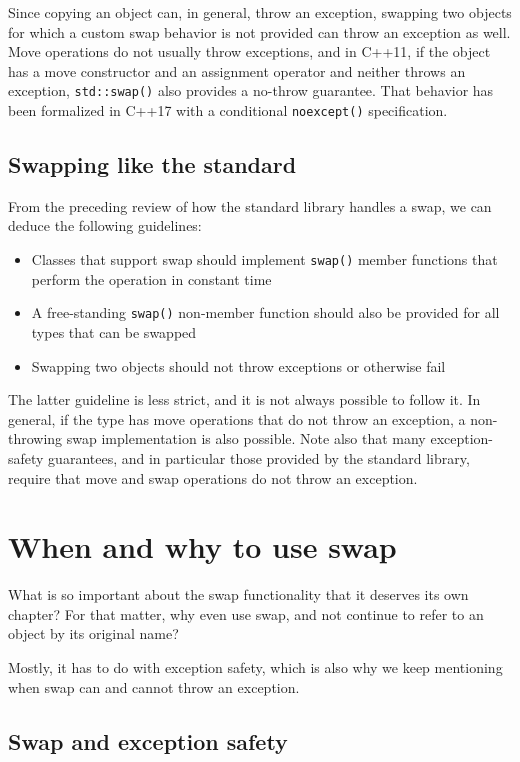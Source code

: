 Since copying an object can, in general, throw an exception, swapping two objects for which a custom swap behavior is not provided can throw an exception as well. Move operations do not usually throw exceptions, and in C++11, if the object has a move constructor and an assignment operator and neither throws an exception, \texttt{std::swap()} also provides a no-throw guarantee. That behavior has been formalized in C++17 with a conditional \texttt{noexcept()} specification.

\subsection{Swapping like the standard}

From the preceding review of how the standard library handles a swap, we can deduce the following guidelines:

\begin{itemize}
\item
  Classes that support swap should implement \texttt{swap()} member functions that perform the operation in constant time
\item
  A free-standing \texttt{swap()} non-member function should also be provided for all types that can be swapped
\item
  Swapping two objects should not throw exceptions or otherwise fail
\end{itemize}

The latter guideline is less strict, and it is not always possible to follow it. In general, if the type has move operations that do not throw an exception, a non-throwing swap implementation is also possible. Note also that many exception-safety guarantees, and in particular those provided by the standard library, require that move and swap operations do not throw an exception.

\section{When and why to use swap}

What is so important about the swap functionality that it deserves its own chapter? For that matter, why even use swap, and not continue to refer to an object by its original name?

Mostly, it has to do with exception safety, which is also why we keep mentioning when swap can and cannot throw an exception.

\subsection{Swap and exception safety}

